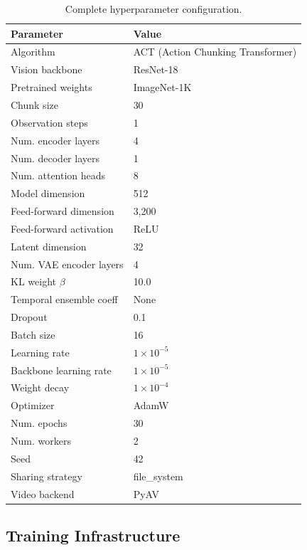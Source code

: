 \documentclass[twoside,twocolumn,10pt]{article}
\begin{document}
\begin{table}[H]
  \centering
  \caption{Complete hyperparameter configuration.}
  \label{tab:hyperparams_full}
  \begin{tabularx}{\columnwidth}{lX}
    \toprule
    Parameter & Value \\
    \midrule
    Algorithm & ACT (Action Chunking Transformer) \\
    Vision backbone & ResNet-18 \\
    Pretrained weights & ImageNet-1K \\
    Chunk size & 30 \\
    Observation steps & 1 \\
    Num. encoder layers & 4 \\
    Num. decoder layers & 1 \\
    Num. attention heads & 8 \\
    Model dimension & 512 \\
    Feed-forward dimension & 3,200 \\
    Feed-forward activation & ReLU \\
    Latent dimension & 32 \\
    Num. VAE encoder layers & 4 \\
    KL weight $\beta$ & 10.0 \\
    Temporal ensemble coeff & None \\
    Dropout & 0.1 \\
    Batch size & 16 \\
    Learning rate & $1\times10^{-5}$ \\
    Backbone learning rate & $1\times10^{-5}$ \\
    Weight decay & $1\times10^{-4}$ \\
    Optimizer & AdamW \\
    Num. epochs & 30 \\
    Num. workers & 2 \\
    Seed & 42 \\
    Sharing strategy & file\_system \\
    Video backend & PyAV \\
    \bottomrule
  \end{tabularx}
\end{table}

\subsection*{Training Infrastructure}
\end{document}
